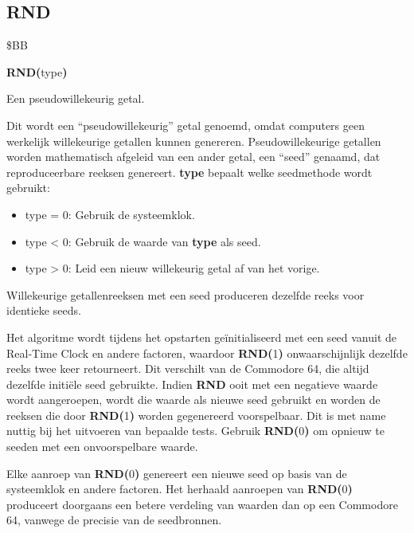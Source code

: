 
\newpage
\subsection{RND}
\begin{description}[leftmargin=2cm,style=nextline]
\item [Token:]    \$BB

\item [Formaat:]   {\bf RND(}type{\bf)}

\item [Retourneert:]  Een pseudowillekeurig getal.

                  Dit wordt een ``pseudowillekeurig'' getal genoemd, omdat computers geen werkelijk willekeurige getallen kunnen genereren. Pseudowillekeurige getallen worden mathematisch afgeleid van een ander getal, een ``seed'' genaamd, dat reproduceerbare reeksen genereert. {\bf type} bepaalt welke seedmethode wordt gebruikt:

                  \begin{itemize}
                     \item type = 0: Gebruik de systeemklok.                     \item type < 0: Gebruik de waarde van {\bf type} als seed.                     \item type > 0: Leid een nieuw willekeurig getal af van het vorige.
                  \end{itemize}

\item [Opmerkingen:]  Willekeurige getallenreeksen met een seed produceren dezelfde reeks voor identieke seeds.

                  Het algoritme wordt tijdens het opstarten geïnitialiseerd met een seed vanuit de Real-Time Clock en andere factoren, waardoor {\bf RND(}1{\bf)} onwaarschijnlijk dezelfde reeks twee keer retourneert. Dit verschilt van de Commodore 64, die altijd dezelfde initiële seed gebruikte. Indien {\bf RND} ooit met een negatieve waarde wordt aangeroepen, wordt die waarde als nieuwe seed gebruikt en worden de reeksen die door {\bf RND(}1{\bf)} worden gegenereerd voorspelbaar. Dit is met name nuttig bij het uitvoeren van bepaalde tests. Gebruik {\bf RND(}0{\bf)} om opnieuw te seeden met een onvoorspelbare waarde.

                  Elke aanroep van {\bf RND(}0{\bf)} genereert een nieuwe seed op basis van de systeemklok en andere factoren. Het herhaald aanroepen van {\bf RND(}0{\bf)} produceert doorgaans een betere verdeling van waarden dan op een Commodore 64, vanwege de precisie van de seedbronnen.


\end{description}
